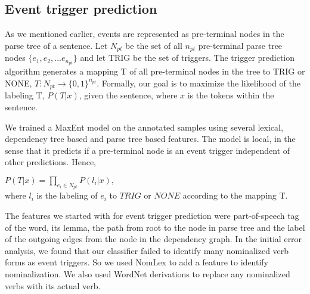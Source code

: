 \subsection{Event trigger prediction}
As we mentioned earlier, events are represented as pre-terminal nodes in the parse tree of a sentence. Let $N_{pt}$ be the set of all $n_{pt}$ pre-terminal parse tree nodes $\{e_1, e_2, ... e_{n_{pt}}\}$ and let TRIG be the set of triggers. The trigger prediction algorithm generates a mapping T of all pre-terminal nodes in the tree to TRIG or NONE, $T : N_{pt} \rightarrow \{0,1\}^{n_{pt}}$. Formally, our goal is to maximize the likelihood of the labeling T,  $P(T | x)$, given the sentence, where $x$ is the tokens within the sentence.

We trained a MaxEnt model on the annotated samples using several lexical, dependency tree based and parse tree based features. The model is local, in the sense that it predicts if a pre-terminal node is an event trigger independent of other predictions. Hence, 

$P(T | x) = \prod_{e_{i}\in N_{pt}} P(l_{i} | x), $\\
where $l_i$ is the labeling of $e_i$ to $TRIG$ or $NONE$ according to the mapping T.

The features we started with for event trigger prediction were part-of-speech tag of the word, its lemma, the path from root to the node in parse tree and the label of the outgoing edges from the node in the dependency graph. In the initial error analysis, we found that our classifier failed to identify many nominalized verb forms as event triggers. So we used NomLex to add a feature to identify nominalization. We also used WordNet derivations to replace any nominalized verbs with its actual verb.